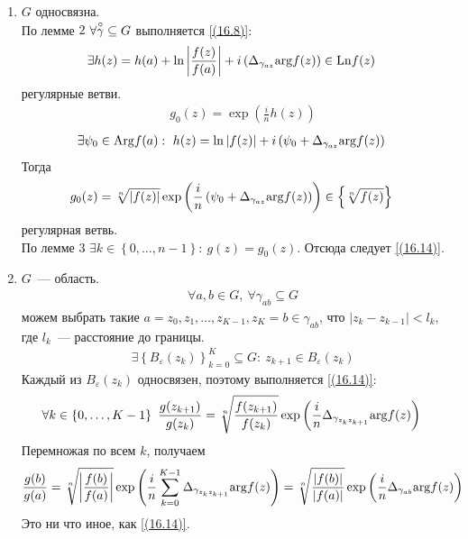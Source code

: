 \begin{enumerate}
    \item $G$ односвязна.
    \\
    По лемме $2$ $\forall \overset{\circ}{\gamma} \subseteq G$ выполняется
    \eqref{(16.8)}:
    \begin{align*}
      & \exists h(z) = h(a) + \ln \left|\frac{f(z)}{f(a)}\right|+ i\left(\Delta_{\gamma_{az}}\mathrm{arg} f(z)\right) \in \mathrm{Ln} f(z)
    \end{align*}
    регулярные ветви.
    \begin{align*}
      & g_0(z) = \exp \left(\frac{i}{n} h(z)\right)
    \end{align*}
    \begin{align*}
      & \exists \psi_0 \in \mathrm{Arg} f(a): \ h(z) = \ln \left| f(z) \right| + i \left( \psi_0 + \Delta_{\gamma_{az}}\mathrm{arg} f(z) \right)
    \end{align*}
    Тогда
    \begin{align*}
      & g_0(z) = \sqrt[n]{\left| f(z) \right|}\exp \left( \frac{i}{n} \left( \psi_0 + \Delta_{\gamma_{az}}\mathrm{arg} f(z) \right) \right)\in \left\{ \sqrt[n]{f(z)} \right\}
    \end{align*}
    регулярная ветвь.
    \\
    По лемме $3$ $\exists k \in \left\{ 0, \dots, n-1 \right\}: \ g(z) = g_0(z)$.
    Отсюда следует \eqref{(16.14)}.
    \item $G$~--- область.
    \begin{align*}
      &\forall a, b \in G, \ \forall \gamma_{ab} \subseteq G
    \end{align*}
    можем выбрать такие $a=z_0, z_1, \dots, z_{K-1}, z_K = b \in \gamma_{ab}$,
    что $\left| z_k - z_{k-1} \right|< l_k$, где $l_k$~--- расстояние до
    границы.
    \begin{align*}
      & \exists \left\{ B_\varepsilon(z_k) \right\}_{k=0}^K \subseteq G: \ z_{k+1} \in B_{\varepsilon}(z_k)
    \end{align*}
    Каждый из $B_{\varepsilon}(z_k)$ односвязен, поэтому выполняется
    \eqref{(16.14)}:
    \begin{align*}
      & \forall k \in \left\{ 0, \dots, K-1 \right\} \ \frac{g(z_{k+1})}{g(z_k)} = \sqrt[n]{\frac{f(z_{k+1})}{f(z_k)}} \exp \left( \frac{i}{n} \Delta_{\gamma_{z_kz_{k+1}}}\argt f(z) \right)
    \end{align*}
    Перемножая по всем $k$, получаем
    \begin{align*}
      & \frac{g(b)}{g(a)} = \sqrt[n]{\left| \frac{f(b)}{f(a)} \right|}\exp \left( \frac{i}{n} \sum_{k=0}^{K-1} \Delta_{\gamma_{z_kz_{k+1}}} \mathrm{arg} f(z) \right) = \sqrt[n]{\frac{\left| f(b) \right|}{\left| f(a) \right|}}\exp \left( \frac{i}{n}\Delta_{\gamma_{ab}}\mathrm{arg} f(z) \right)
    \end{align*}
    Это ни что иное, как \eqref{(16.14)}.
\end{enumerate}\theorem
